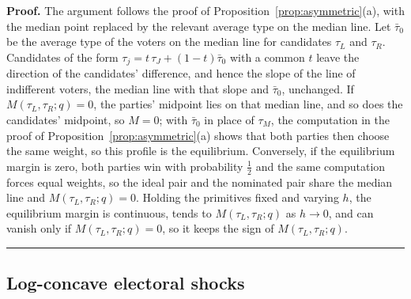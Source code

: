 \documentclass[12pt,letterpaper]{article}
\newenvironment{proof}[1][Proof]{\noindent\textbf{#1.} }{\ \rule{0.5em}{0.5em}}
\begin{document}
\begin{proof}
The argument follows the proof of Proposition~\ref{prop:asymmetric}(a), with the median point replaced by the relevant average type on the median line. Let $\bar\tau_0$ be the average type of the voters on the median line for candidates $\tau_L$ and $\tau_R$. Candidates of the form $\tau_j=t\,\tau_J+(1-t)\bar\tau_0$ with a common $t$ leave the direction of the candidates' difference, and hence the slope of the line of indifferent voters, the median line with that slope and $\bar\tau_0$, unchanged. If $M(\tau_L,\tau_R;q)=0$, the parties' midpoint lies on that median line, and so does the candidates' midpoint, so $M=0$; with $\bar\tau_0$ in place of $\tau_M$, the computation in the proof of Proposition~\ref{prop:asymmetric}(a) shows that both parties then choose the same weight, so this profile is the equilibrium. Conversely, if the equilibrium margin is zero, both parties win with probability $\tfrac12$ and the same computation forces equal weights, so the ideal pair and the nominated pair share the median line and $M(\tau_L,\tau_R;q)=0$. Holding the primitives fixed and varying $h$, the equilibrium margin is continuous, tends to $M(\tau_L,\tau_R;q)$ as $h\to0$, and can vanish only if $M(\tau_L,\tau_R;q)=0$, so it keeps the sign of $M(\tau_L,\tau_R;q)$.
\end{proof}

\subsection*{Log-concave electoral shocks}
\end{document}
